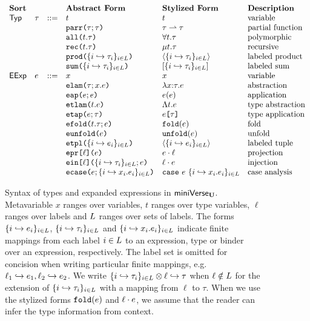 \begin{figure}
$\begin{array}{lllllll}
\textbf{Sort} & & & \textbf{Abstract Form} & \textbf{Stylized Form} & \textbf{Description}\\
\mathsf{Typ} & \tau & ::= & t & t & \text{variable}\\
&&& \texttt{parr}\texttt{(}\tau; \tau\texttt{)} & \tau \rightharpoonup \tau & \text{partial function}\\
&&& \texttt{all}\texttt{(}t.\tau\texttt{)} & \forall t.\tau & \text{polymorphic}\\
&&& \texttt{rec}\texttt{(}t.\tau\texttt{)} & \mu t.\tau & \text{recursive}\\
&&& \texttt{prod}\texttt{(}\{i \hookrightarrow \tau_{i}\}_{i \in L}\texttt{)} & \langle \{i \hookrightarrow \tau_{i}\}_{i \in L} \rangle & \text{labeled product}\\
&&& \texttt{sum}\texttt{(}\{i \hookrightarrow \tau_{i}\}_{i \in L}\texttt{)} & [\{i \hookrightarrow \tau_{i}\}_{i \in L}] & \text{labeled sum}\\
\mathsf{EExp} & e & ::= & x & x & \text{variable}\\
&&& \texttt{elam}\texttt{(}\tau; x.e\texttt{)} & \lambda x{:}\tau.e & \text{abstraction}\\
&&& \texttt{eap}\texttt{(}e; e\texttt{)} & e(e) & \text{application}\\
&&& \texttt{etlam}\texttt{(}t.e\texttt{)} & \Lambda t.e & \text{type abstraction}\\
&&& \texttt{etap}\texttt{(}e; \tau\texttt{)} & e\texttt{[}\tau\texttt{]} & \text{type application}\\
&&& \texttt{efold}\texttt{(}t.\tau; e\texttt{)} & \texttt{fold}(e) & \text{fold}\\
&&& \texttt{eunfold}\texttt{(}e\texttt{)} & \texttt{unfold}(e) & \text{unfold}\\
&&& \texttt{etpl}\texttt{(}\{i \hookrightarrow e_{i}\}_{i \in L}\texttt{)} & \langle \{i \hookrightarrow e_{i}\}_{i \in L}\rangle & \text{labeled tuple}\\
&&& \texttt{epr}\texttt{[}\ell\texttt{](}e\texttt{)} & e \cdot \ell & \text{projection}\\
&&& \texttt{ein}\texttt{[}\ell\texttt{](}\{i \hookrightarrow \tau_{i}\}_{i \in L}; e\texttt{)} & \ell \cdot e & \text{injection}\\
&&& \texttt{ecase}\texttt{(}e; \{i \hookrightarrow x_{i}.e_{i}\}_{i \in L}\texttt{)} & \texttt{case}~e~\{i \hookrightarrow x_{i}.e_{i}\}_{i \in L} & \text{case analysis}
\end{array}$
\caption[Syntax of types and expanded expressions in $\miniVerseU$.]{Syntax of types and expanded expressions in $\miniVerseU$. Metavariable $x$ ranges over variables, $t$ ranges over type variables, $\ell$ ranges over labels and $L$ ranges over sets of labels. The forms $\{i \hookrightarrow e_{i}\}_{i \in L}$, $\{i \hookrightarrow \tau_{i}\}_{i \in L}$ and $\{i \hookrightarrow x_{i}.e_{i}\}_{i \in L}$ indicate finite mappings from each label $i \in L$ to an expression, type or binder over an expression, respectively. The label set is omitted for concision when writing particular finite mappings, e.g. $\ell_1 \hookrightarrow e_1, \ell_2 \hookrightarrow e_2$. We write $\{i \hookrightarrow \tau_{i}\}_{i \in L} \otimes \ell \hookrightarrow \tau$ when $\ell \notin L$ for the extension of $\{i \hookrightarrow \tau_{i}\}_{i \in L}$ with a mapping from $\ell$ to $\tau$. When we use the stylized forms $\texttt{fold}(e)$ and $\ell \cdot e$, we assume that the reader can infer the type information from context. }
\label{fig:U-expanded-terms}
\end{figure}


